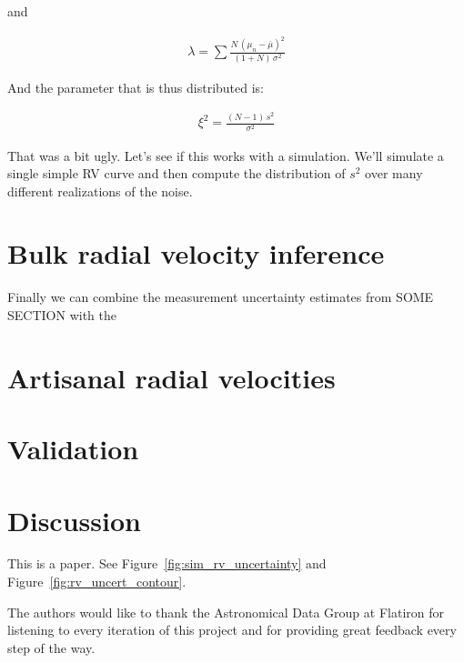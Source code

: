 \documentclass[modern, letterpaper]{aastex63}
\begin{document}
and

\begin{eqnarray}
  \lambda = \sum \frac{N\,(\mu_n - \bar{\mu})^2}{(1 + N)\,\sigma^2}
\end{eqnarray}

And the parameter that is thus distributed is:

\begin{eqnarray}
  \xi^2 = \frac{(N - 1)\,s^2}{\sigma^2}
\end{eqnarray}

That was a bit ugly.
Let's see if this works with a simulation.
We'll simulate a single simple RV curve and then compute the distribution of $s^2$ over many different realizations of the noise.

\section{Bulk radial velocity inference}

Finally we can combine the measurement uncertainty estimates from SOME SECTION with the

\section{Artisanal radial velocities}

\section{Validation}

\section{Discussion}

This is a paper.
See Figure~\ref{fig:sim_rv_uncertainty} and Figure~\ref{fig:rv_uncert_contour}.




\acknowledgments
The authors would like to thank the Astronomical Data Group at Flatiron for listening to every iteration of this project and for providing great feedback every step of the way.
\end{document}
